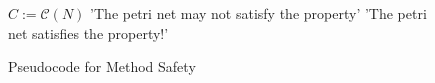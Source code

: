 \begin{figure}
  \begin{algorithmic}[1]
    \State $C := \mathcal C(N)$
    \State \Return 'The petri net may not satisfy the property'
    \Else
    \State \Return 'The petri net satisfies the property!'
    \EndIf
  \end{algorithmic}
  \caption{Pseudocode for Method Safety}
  \label{fig:method-safety-pseudocode}
\end{figure}
